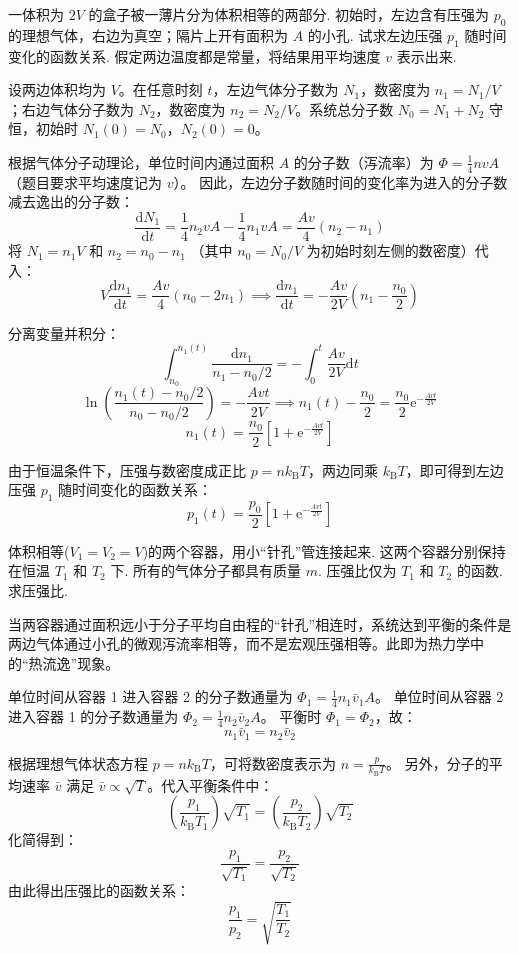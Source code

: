 \begin{exercise}\label{ex:13.3}
一体积为 $2V$ 的盒子被一薄片分为体积相等的两部分. 初始时，左边含有压强为 $p_0$ 的理想气体，右边为真空；隔片上开有面积为 $A$ 的小孔. 试求左边压强 $p_1$ 随时间变化的函数关系. 假定两边温度都是常量，将结果用平均速度 $v$ 表示出来.
\end{exercise}
\begin{solution}
设两边体积均为 $V$。在任意时刻 $t$，左边气体分子数为 $N_1$，数密度为 $n_1 = N_1/V$；右边气体分子数为 $N_2$，数密度为 $n_2 = N_2/V$。系统总分子数 $N_0 = N_1 + N_2$ 守恒，初始时 $N_1(0) = N_0$，$N_2(0) = 0$。

根据气体分子动理论，单位时间内通过面积 $A$ 的分子数（泻流率）为 $\Phi = \frac{1}{4} n v A$（题目要求平均速度记为 $v$）。
因此，左边分子数随时间的变化率为进入的分子数减去逸出的分子数：
$$ \frac{\mathrm{d}N_1}{\mathrm{d}t} = \frac{1}{4} n_2 v A - \frac{1}{4} n_1 v A = \frac{A v}{4} (n_2 - n_1) $$
将 $N_1 = n_1 V$ 和 $n_2 = n_0 - n_1$ （其中 $n_0 = N_0/V$ 为初始时刻左侧的数密度）代入：
$$ V \frac{\mathrm{d}n_1}{\mathrm{d}t} = \frac{A v}{4} (n_0 - 2n_1) \implies \frac{\mathrm{d}n_1}{\mathrm{d}t} = -\frac{A v}{2V} \left( n_1 - \frac{n_0}{2} \right) $$

分离变量并积分：
$$ \int_{n_0}^{n_1(t)} \frac{\mathrm{d}n_1}{n_1 - n_0/2} = -\int_0^t \frac{A v}{2V} \mathrm{d}t $$
$$ \ln \left( \frac{n_1(t) - n_0/2}{n_0 - n_0/2} \right) = -\frac{A v t}{2V} \implies n_1(t) - \frac{n_0}{2} = \frac{n_0}{2} \mathrm{e}^{-\frac{A v t}{2V}} $$
$$ n_1(t) = \frac{n_0}{2} \left[ 1 + \mathrm{e}^{-\frac{A v t}{2V}} \right] $$

由于恒温条件下，压强与数密度成正比 $p = n k_{\mathrm{B}} T$，两边同乘 $k_{\mathrm{B}} T$，即可得到左边压强 $p_1$ 随时间变化的函数关系：
$$ p_1(t) = \frac{p_0}{2} \left[ 1 + \mathrm{e}^{-\frac{A v t}{2V}} \right] $$
\end{solution}

\begin{exercise}\label{ex:13.4}
体积相等($V_1 = V_2 = V$)的两个容器，用小“针孔”管连接起来. 这两个容器分别保持在恒温 $T_1$ 和 $T_2$ 下. 所有的气体分子都具有质量 $m$. 压强比仅为 $T_1$ 和 $T_2$ 的函数. 求压强比.
\end{exercise}
\begin{solution}
当两容器通过面积远小于分子平均自由程的“针孔”相连时，系统达到平衡的条件是两边气体通过小孔的微观泻流率相等，而不是宏观压强相等。此即为热力学中的“热流逸”现象。

单位时间从容器 1 进入容器 2 的分子数通量为 $\Phi_1 = \frac{1}{4} n_1 \bar{v}_1 A$。
单位时间从容器 2 进入容器 1 的分子数通量为 $\Phi_2 = \frac{1}{4} n_2 \bar{v}_2 A$。
平衡时 $\Phi_1 = \Phi_2$，故：
$$ n_1 \bar{v}_1 = n_2 \bar{v}_2 $$

根据理想气体状态方程 $p = n k_{\mathrm{B}} T$，可将数密度表示为 $n = \frac{p}{k_{\mathrm{B}} T}$。
另外，分子的平均速率 $\bar{v}$ 满足 $\bar{v} \propto \sqrt{T}$。代入平衡条件中：
$$ \left( \frac{p_1}{k_{\mathrm{B}} T_1} \right) \sqrt{T_1} = \left( \frac{p_2}{k_{\mathrm{B}} T_2} \right) \sqrt{T_2} $$
化简得到：
$$ \frac{p_1}{\sqrt{T_1}} = \frac{p_2}{\sqrt{T_2}} $$
由此得出压强比的函数关系：
$$ \frac{p_1}{p_2} = \sqrt{\frac{T_1}{T_2}} $$
\end{solution}

